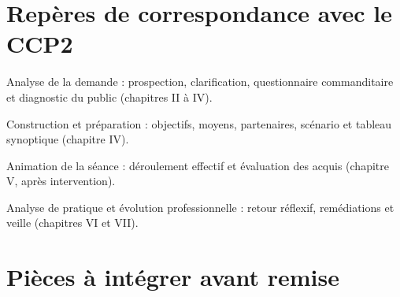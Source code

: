 \section{Repères de correspondance avec le CCP2}
\begin{description}[leftmargin=2.9cm,style=nextline]
\item[Compétence 8] Analyse de la demande : prospection, clarification, questionnaire commanditaire et diagnostic du public (chapitres II à IV).
\item[Compétence 9] Construction et préparation : objectifs, moyens, partenaires, scénario et tableau synoptique (chapitre IV).
\item[Compétence 10] Animation de la séance : déroulement effectif et évaluation des acquis (chapitre V, après intervention).
\item[Compétence 11] Analyse de pratique et évolution professionnelle : retour réflexif, remédiations et veille (chapitres VI et VII).
\end{description}

\section{Pièces à intégrer avant remise}
